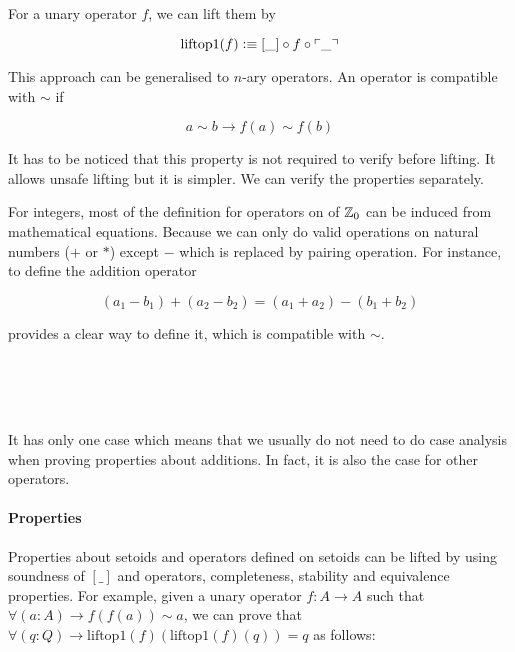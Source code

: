 For a unary operator $f$, we can lift them by 

$$\text{liftop1}(f) \vcentcolon\equiv [\_] \circ f \circ \ulcorner\_\urcorner$$

This approach can be generalised to $n$-ary operators. An operator is compatible with $\sim$ if


$$a \sim b \to f(a) \sim f(b)$$


It has to be noticed that this property is not required to verify before lifting.
It allows unsafe lifting but it is simpler. We can verify the properties separately. 

For integers, most of the definition for operators on of $\mathbb{Z}_0$ can be induced from mathematical equations. Because we can only do valid operations on natural numbers ($+$ or $*$) except $-$ which is replaced by pairing operation. For instance, to define the addition operator

$$(a_1 - b_1) + (a_2 - b_2) = (a_1 + a_2) - (b_1 + b_2)$$

provides a clear way to define it, which is compatible with $\sim$.

\begin{code}
\\
\>\AgdaFunction{\_+\_} \AgdaSymbol{:}     \<%
\\
\>\AgdaSymbol{(} \AgdaInductiveConstructor{,} \AgdaSymbol{)} \AgdaFunction{+} \AgdaSymbol{(} \AgdaInductiveConstructor{,} \AgdaSymbol{)} \AgdaSymbol{=} \AgdaSymbol{(}  \AgdaSymbol{)} \AgdaInductiveConstructor{,} \AgdaSymbol{(}  \AgdaSymbol{)}\<%
\\
\end{code}

It has only one case which means that we usually do not need to do case analysis when proving properties about additions. In fact, it is also the case for other operators.



\paragraph{Properties}

Properties about setoids and operators defined on setoids can be lifted by using soundness of $[\_]$ and operators, completeness, stability and equivalence properties. For example, given a unary operator $f : A \to A$ such that $\forall (a : A) \to f (f (a)) \sim a$, we can prove that $\forall(q : Q) \to \text{liftop1}(f)(\text{liftop1}(f)(q)) = q$ as follows:

